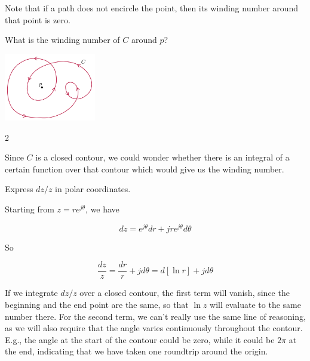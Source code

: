 Note that if a path does not encircle the point, then its winding number around that point is zero.

\begin{exer}

What is the winding number of $C$ around $p$?

\begin{center}
\includegraphics[width=4cm]{kk/figures/winding_number_exer}
\end{center}

\begin{sol}
2
\end{sol}

\end{exer}

Since $C$ is a closed contour, we could wonder whether there is an integral of a certain function over that contour which would give us the winding number.

\pagebreak

\begin{cue}
Express $dz/z$ in polar coordinates.    
\end{cue}

Starting from $z=r e^{j\theta}$, we have

\begin{equation}
dz = e^{j\theta} dr + jr  e^{j\theta} d \theta 
\end{equation}   

So

\begin{equation}
\frac{dz}{z} = \frac{dr}{r} + j d\theta = d [\ln r] + j d\theta    
\end{equation}

If we integrate $dz/z$ over a closed contour, the first term will vanish, since the beginning and the end point are the same, so that $\ln z$ will evaluate to the same number there. For the second term, we can't really use the same line of reasoning, as we will also require that the angle varies continuously throughout the contour. E.g., the angle at the start of the contour could be zero, while it could be $2 \pi$ at the end, indicating that we have taken one roundtrip around the origin. 

